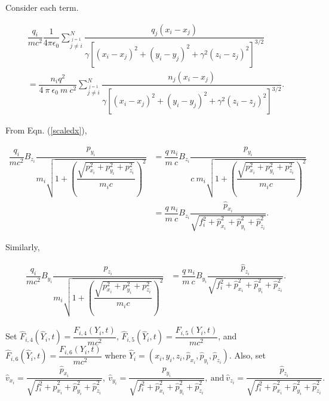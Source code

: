 \documentclass[oneside,12pt]{book}
\begin{document}
Consider each term.

\begin{multline*}
\dfrac{q_i}{mc^2}\dfrac{1}{4 \pi \epsilon_0}\sum_{\stackrel{j=1}{j \neq i}}^N \dfrac{q_j(x_i-x_j)}{\gamma[(x_i-x_j)^2+(y_i-y_j)^2+\gamma^2(z_i-z_j)^2]^{3 \slash 2}}\\
=\dfrac{n_i q^2}{4 \ \pi \ \epsilon_0 \ m \ c^2}\sum_{\stackrel{j=1}{j \neq i}}^N \dfrac{n_j(x_i-x_j)}{\gamma[(x_i-x_j)^2+(y_i-y_j)^2+\gamma^2(z_i-z_j)^2]^{3 \slash 2}}.
\end{multline*}

From Eqn. (\ref{scaledx}),

\begin{align*}
\dfrac{q_i}{mc^2}B_{z_i} \dfrac{p_{y_i}}{m_i \sqrt{1+\left(\dfrac{\sqrt{p_{x_i}^2 + p_{y_i}^2 + p_{z_i}^2}}{m_i c}\right)^2}}
&=\dfrac{q \ n_i}{m \ c}B_{z_i} \dfrac{p_{y_i}}{c \ m_i \sqrt{1+\left(\dfrac{\sqrt{p_{x_i}^2 + p_{y_i}^2 + p_{z_i}^2}}{m_i c}\right)^2}}\\
&=\dfrac{q \ n_i}{m \ c}B_{z_i} \dfrac{\hat{p}_{x_i}}{\sqrt{f_i^2+\hat{p}_{x_i}^2 + \hat{p}_{y_i}^2 + \hat{p}_{z_i}^2}}.
\end{align*}

Similarly,

\begin{align*}
\dfrac{q_i}{mc^2} B_{y_i} \dfrac{p_{z_i}}{m_i \sqrt{1+\left(\dfrac{\sqrt{p_{x_i}^2 + p_{y_i}^2 + p_{z_i}^2}}{m_i c}\right)^2}} &=\dfrac{q \ n_i}{m \ c} B_{y_i} \dfrac{\hat{p}_{z_i}}{\sqrt{f_i^2+\hat{p}_{x_i}^2 + \hat{p}_{y_i}^2 + \hat{p}_{z_i}^2}}.
\end{align*}

Set $\hat{F}_{i,4} (\hat{Y}_i,t)=\dfrac{F_{i,4} (Y_i,t)}{mc^2}$, $\hat{F}_{i,5} (\hat{Y}_i,t)=\dfrac{F_{i,5} (Y_i,t)}{mc^2}$, and $\hat{F}_{i,6} (\hat{Y}_i,t)=\dfrac{F_{i,6} (Y_i,t)}{mc^2}$ where $\hat{Y}_i=(x_i,y_i,z_i,\hat{p}_{x_i},\hat{p}_{y_i},\hat{p}_{z_i})$.  Also, set
\[\hat{v}_{x_i}=\dfrac{\hat{p}_{x_i}}{\sqrt{f_i^2+\hat{p}_{x_i}^2 + \hat{p}_{y_i}^2 + \hat{p}_{z_i}^2}}, \
\hat{v}_{y_i}=\dfrac{\hat{p}_{y_i}}{\sqrt{f_i^2+\hat{p}_{x_i}^2 + \hat{p}_{y_i}^2 + \hat{p}_{z_i}^2}}, \ \text{and} \
\hat{v}_{z_i}=\dfrac{\hat{p}_{z_i}}{\sqrt{f_i^2+\hat{p}_{x_i}^2 + \hat{p}_{y_i}^2 + \hat{p}_{z_i}^2}}.\]
\end{document}
